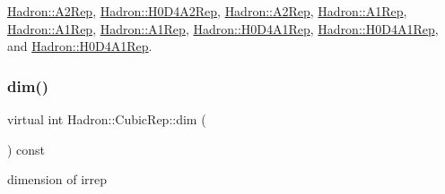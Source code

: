 \mbox{\hyperlink{structHadron_1_1A2Rep_a17b15564f35f6be6afa4a189806da16b}{Hadron\+::\+A2\+Rep}}, \mbox{\hyperlink{structHadron_1_1H0D4A2Rep_ab746308c018d06bc8d3e1822f84c9049}{Hadron\+::\+H0\+D4\+A2\+Rep}}, \mbox{\hyperlink{structHadron_1_1A2Rep_a17b15564f35f6be6afa4a189806da16b}{Hadron\+::\+A2\+Rep}}, \mbox{\hyperlink{structHadron_1_1A1Rep_a4f7f61f8c9a5113c9407be6609cf7fbe}{Hadron\+::\+A1\+Rep}}, \mbox{\hyperlink{structHadron_1_1A1Rep_a4f7f61f8c9a5113c9407be6609cf7fbe}{Hadron\+::\+A1\+Rep}}, \mbox{\hyperlink{structHadron_1_1A1Rep_a4f7f61f8c9a5113c9407be6609cf7fbe}{Hadron\+::\+A1\+Rep}}, \mbox{\hyperlink{structHadron_1_1H0D4A1Rep_ac5a45aa7f7cdc3ab70b8c164b2e1dce0}{Hadron\+::\+H0\+D4\+A1\+Rep}}, \mbox{\hyperlink{structHadron_1_1H0D4A1Rep_ac5a45aa7f7cdc3ab70b8c164b2e1dce0}{Hadron\+::\+H0\+D4\+A1\+Rep}}, and \mbox{\hyperlink{structHadron_1_1H0D4A1Rep_ac5a45aa7f7cdc3ab70b8c164b2e1dce0}{Hadron\+::\+H0\+D4\+A1\+Rep}}.

\mbox{\label{structHadron_1_1CubicRep_ac178d14064f037a66af4b9fb4b312d51}} 
\subsubsection{\texorpdfstring{dim()}{dim()}\hspace{0.1cm}{\footnotesize\ttfamily [2/3]}}
{\footnotesize\ttfamily virtual int Hadron\+::\+Cubic\+Rep\+::dim (\begin{DoxyParamCaption}{ }\end{DoxyParamCaption}) const\hspace{0.3cm}{\ttfamily [pure virtual]}}

dimension of irrep 

